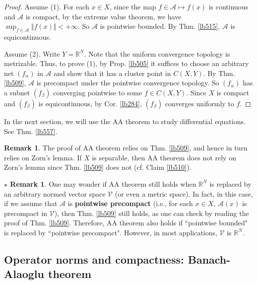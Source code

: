 \documentclass[12pt,b5paper,notitlepage]{article}
\theoremstyle{definition}
\newtheorem{rem}[df]{Remark}
\newtheorem{srem}[df]{$\star$ Remark}
\theoremstyle{plain}
\newcommand{\mc}{\mathcal}
\newcommand{\scr}{\mathscr}
\newcommand{\Rbb}{\mathbb R}
\numberwithin{equation}{section}
\begin{document}


\begin{proof}
Assume (1). For each $x\in X$, since the map $f\in\scr A\mapsto f(x)$ is continuous and $\scr A$ is compact, by the extreme value theorem, we have $\sup_{f\in\scr A}\Vert f(x)\Vert<+\infty$. So $\scr A$ is pointwise bounded. By Thm. \ref{lb515}, $\scr A$ is equicontinuous.

Assume (2). Write $Y=\Rbb^N$. Note that the uniform convergence topology is metrizable. Thus, to prove (1), by Prop. \ref{lb505} it suffices to choose an arbitrary net $(f_\alpha)$ in $\scr A$ and show that it has a cluster point in $C(X,Y)$. By Thm. \ref{lb509}, $\scr A$ is precompact under the pointwise convergence topology. So $(f_\alpha)$ has a subnet $(f_\beta)$ converging pointwise to some $f\in C(X,Y)$. Since $X$ is compact and $(f_\beta)$ is equicontinuous, by Cor. \ref{lb284}, $(f_\beta)$ converges uniformly to $f$. 
\end{proof}


In the next section, we will use the AA theorem to study differential equations. See Thm. \ref{lb557}.


\begin{rem}
The proof of AA theorem relies on Thm. \ref{lb509}, and hence in turn relies on Zorn's lemma. If $X$ is separable, then AA theorem does not rely on Zorn's lemma since Thm. \ref{lb509} does not (cf. Claim \ref{lb510}).
\end{rem}

\begin{srem}
One may wonder if AA theorem still holds when $\Rbb^N$ is replaced by an arbitrary normed vector space $\mc V$ (or even a metric space). In fact, in this case, if we assume that $\scr A$ is \textbf{pointwise precompact} (i.e., for each $x\in X$, $\scr A(x)$ is precompact in $\mc V$), then Thm. \ref{lb509} still holds, as one can check by reading the proof of Thm. \ref{lb509}. Therefore, AA theorem also holds if ``pointwise bounded" is replaced by ``pointwise precompact". However, in most applications, $\mc V$ is $\Rbb^N$.
\end{srem}



\subsection{Operator norms and compactness: Banach-Alaoglu theorem}
\end{document}

